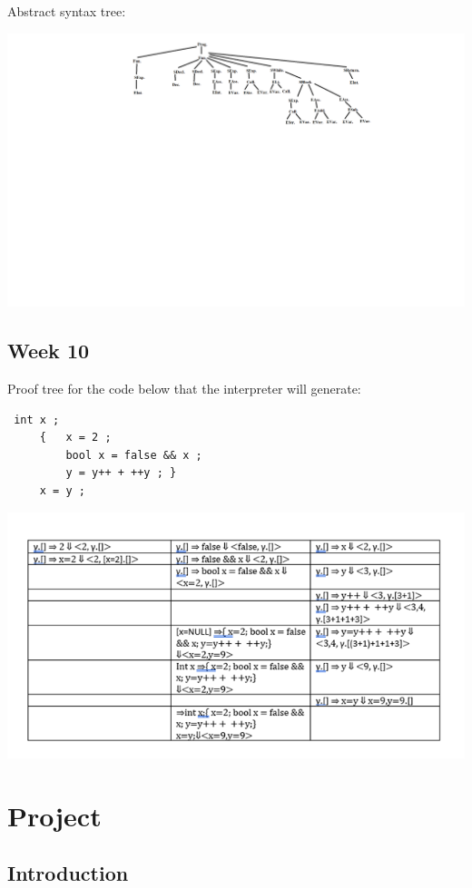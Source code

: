 \documentclass{article}
\theoremstyle{theorem}
\theoremstyle{definition}
\theoremstyle{remark}
\begin{document}
Abstract syntax tree:

\includegraphics[scale=0.3]{Images/FibAbstractTree.png}

\subsection{Week 10}

Proof tree for the code below that the interpreter will generate:

\begin{lstlisting}
 int x ;
     {   x = 2 ;
         bool x = false && x ;
         y = y++ + ++y ; }
     x = y ;
\end{lstlisting}

\includegraphics[scale=1.0]{Images/Week10_tree.png}

\section{Project}

\subsection{Introduction}
\end{document}
